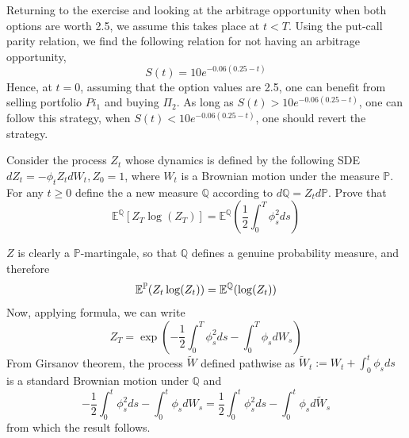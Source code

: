 \documentclass[12pt,a4paper]{exam}
\begin{document}
\begin{questions}
\begin{solution}
Returning to the exercise and looking at the arbitrage opportunity when both options are worth 2.5, we assume this takes place at $t < T$. Using the put-call parity relation, we find the following relation for not having an arbitrage opportunity, 
\begin{equation*}
S(t) = 10e^{-0.06(0.25-t)}
\end{equation*}
Hence, at $t = 0$, assuming that the option values are 2.5, one can benefit from selling portfolio $Pi_1$ and buying $\Pi_2$. As long as $S(t) > 10 e^{
-0.06(0.25-t)}$, one can follow this strategy, when $S(t) < 10 e^{-0.06(0.25-t)}$, one should revert the strategy.
\end{solution}

\question Consider the process $Z_t$ whose dynamics is defined by the following SDE $dZ_t = -\phi_tZ_tdW_t, Z_0=1$, where $W_t$ is a Brownian motion under the measure $\mathbb{P}$. For any $t\geq 0$ define the a new measure $\mathbb{Q}$ according to $d\mathbb{Q}=Z_t d\mathbb{P}$.
Prove that 
\begin{equation*}
\mathbb{E}^{\mathbb{Q}}[Z_T\log(Z_T)] = \mathbb{E}^{\mathbb{Q}}\left(\frac{1}{2}\int_0^T\phi_s^2 ds\right)
\end{equation*}

\fillwithlines{3cm}
\begin{solution}
$Z$ is clearly a $\mathbb{P}$-martingale, so that $\mathbb{Q}$ defines a genuine probability measure, and therefore
\begin{equation*}
\mathbb{E}^\mathbb{P}(Z_t\log(Z_t)) = \mathbb{E}^\mathbb{Q}(\log(Z_t))
\end{equation*}
Now, applying \ito formula, we can write
\begin{equation*}
Z_T = \exp\left(-\frac{1}{2}\int_0^T \phi_s^2 ds - \int_0^T \phi_s dW_s\right)
\end{equation*}
From Girsanov theorem, the process $\tilde{W}$ defined pathwise as $\tilde{W}_t := W_t +\int_0^t\phi_s ds$ is a standard Brownian motion under $\mathbb{Q}$ and 
\begin{equation*}
-\frac{1}{2}\int_0^t \phi_s^2 ds - \int_0^t \phi_s dW_s = \frac{1}{2}\int_0^t \phi_s^2 ds - \int_0^t \phi_s d\tilde{W}_s
\end{equation*}
from which the result follows.
\end{solution}


\end{questions}
\end{document}
